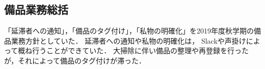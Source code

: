 \subsection*{備品業務総括}

「延滞者への通知」，「備品のタグ付け」，「私物の明確化」を2019年度秋学期の備品業務方針としていた． 延滞者への通知や私物の明確化は， Slackや声掛けによって概ね行うことができていた． 大掃除に伴い備品の整理や再登録を行ったが，それによって備品のタグ付けが滞った．


